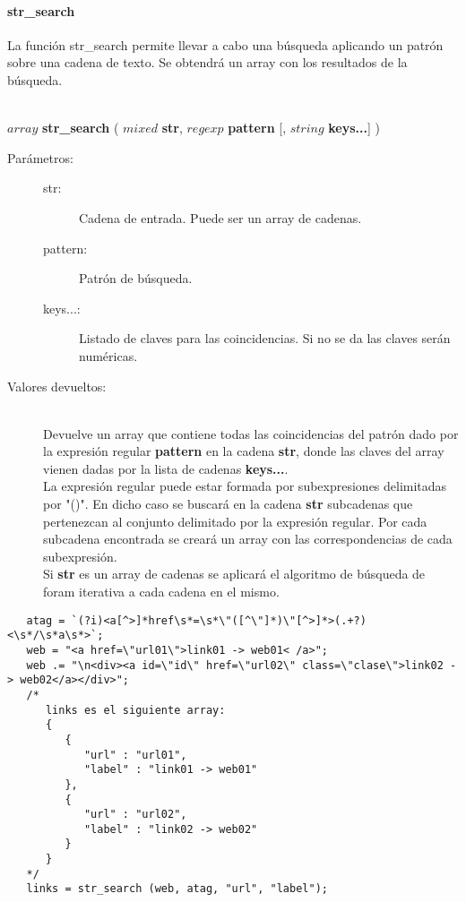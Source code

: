 \paragraph{str\_search}
La función str\_search permite llevar a cabo una búsqueda aplicando un patrón sobre una 
cadena de texto. Se obtendrá un array con los resultados de la búsqueda.

\hfill \\ $array$ \textbf{str\_search} ( $mixed$ \textbf{str}, $regexp$ \textbf{pattern} [, $string$ \textbf{keys...}] )  
\begin{description}
\item [Parámetros:] \hfill 
   \begin{description}
   \item[str:] Cadena de entrada. Puede ser un array de cadenas.
   \item[pattern:] Patrón de búsqueda. 
   \item[keys...:] Listado de claves para las coincidencias. Si no se da las
   claves serán numéricas.
   \end{description}
\item[Valores devueltos:] \hfill \\
   Devuelve un array que contiene todas las coincidencias del patrón dado por la 
   expresión regular \textbf{pattern} en la cadena \textbf{str}, donde las 
   claves del array vienen dadas por la lista de cadenas \textbf{keys...}. \\
   
   La expresión regular puede estar formada por subexpresiones delimitadas
   por "()". En dicho caso se buscará en la cadena \textbf{str} subcadenas que pertenezcan al
   conjunto delimitado por la expresión regular. Por cada subcadena encontrada se creará un array
   con las correspondencias de cada subexpresión. \\
   
   Si \textbf{str} es un array de cadenas se aplicará el algoritmo de búsqueda de foram iterativa a cada cadena en el mismo.
\end{description}

\begin{lstlisting}   
   atag = `(?i)<a[^>]*href\s*=\s*\"([^\"]*)\"[^>]*>(.+?)<\s*/\s*a\s*>`;
   web = "<a href=\"url01\">link01 -> web01< /a>";
   web .= "\n<div><a id=\"id\" href=\"url02\" class=\"clase\">link02 -> web02</a></div>";
   /*
      links es el siguiente array:
      {
         {
            "url" : "url01",
            "label" : "link01 -> web01"
         },
         {
            "url" : "url02",
            "label" : "link02 -> web02"
         }
      }
   */
   links = str_search (web, atag, "url", "label");
\end{lstlisting}
\hfill\\ 

